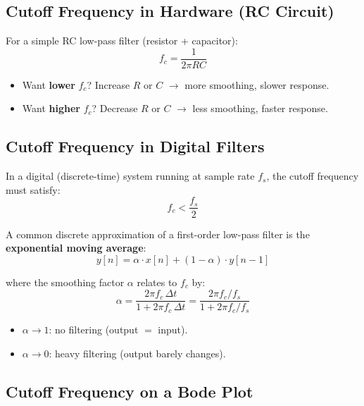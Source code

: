 \documentclass[12pt,a4paper]{article}
\begin{document}
\subsection{Cutoff Frequency in Hardware (RC Circuit)}

For a simple RC low-pass filter (resistor + capacitor):
\begin{equation}
    f_c = \frac{1}{2\pi RC}
\end{equation}

\begin{itemize}
    \item Want \textbf{lower} $f_c$? Increase $R$ or $C$ $\to$ more smoothing, slower response.
    \item Want \textbf{higher} $f_c$? Decrease $R$ or $C$ $\to$ less smoothing, faster response.
\end{itemize}

\subsection{Cutoff Frequency in Digital Filters}

In a digital (discrete-time) system running at sample rate $f_s$, the cutoff frequency must satisfy:
\begin{equation}
    f_c < \frac{f_s}{2}
\end{equation}

A common discrete approximation of a first-order low-pass filter is the \textbf{exponential moving average}:
\begin{equation}
    y[n] = \alpha \cdot x[n] + (1 - \alpha) \cdot y[n-1]
\end{equation}

where the smoothing factor $\alpha$ relates to $f_c$ by:
\begin{equation}
    \alpha = \frac{2\pi f_c \,\Delta t}{1 + 2\pi f_c\, \Delta t}
           = \frac{2\pi f_c / f_s}{1 + 2\pi f_c / f_s}
\end{equation}

\begin{itemize}
    \item $\alpha \to 1$: no filtering (output $=$ input).
    \item $\alpha \to 0$: heavy filtering (output barely changes).
\end{itemize}

\subsection{Cutoff Frequency on a Bode Plot}
\end{document}
